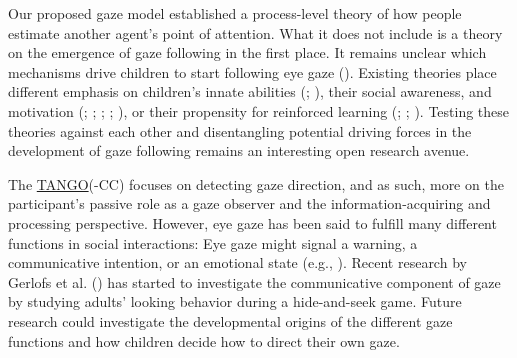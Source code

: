 \documentclass[
]{scrbook}
\begin{document}
Our proposed gaze model established a process-level theory of how people estimate another agent's point of attention. What it does not include is a theory on the emergence of gaze following in the first place. It remains unclear which mechanisms drive children to start following eye gaze (). Existing theories place different emphasis on children's innate abilities (; ), their social awareness, and motivation (; ; ; ; ), or their propensity for reinforced learning (; ; ). Testing these theories against each other and disentangling potential driving forces in the development of gaze following remains an interesting open research avenue.

The \hyperref[acronyms_TANGO]{TANGO}(-CC) focuses on detecting gaze direction, and as such, more on the participant's passive role as a gaze observer and the information-acquiring and processing perspective. However, eye gaze has been said to fulfill many different functions in social interactions: Eye gaze might signal a warning, a communicative intention, or an emotional state (e.g., ). Recent research by Gerlofs et al. () has started to investigate the communicative component of gaze by studying adults' looking behavior during a hide-and-seek game. Future research could investigate the developmental origins of the different gaze functions and how children decide how to direct their own gaze.
\end{document}
